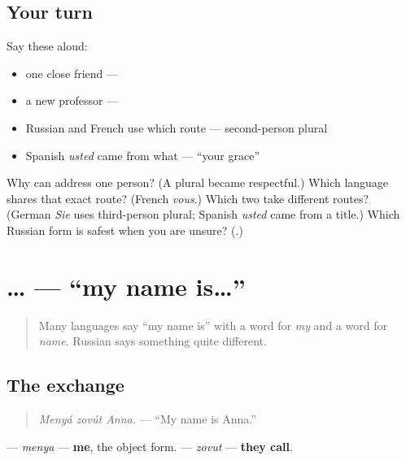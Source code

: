 \subsection*{Your turn}
Say these aloud:

\begin{itemize}
\raggedright
  \item one close friend — \emph{}
  \item a new professor — \emph{}
  \item Russian and French use which route — second-person plural
  \item Spanish \emph{usted} came from what — \textquotedblleft{}your grace\textquotedblright{}
\end{itemize}

\begin{tcolorbox}[breakable,colback=teal!4,colframe=teal!35!black,title={Before you move on}]
Why can \emph{} address one person? (A plural became respectful.) Which language shares that exact route? (French \emph{vous}.) Which two take different routes? (German \emph{Sie} uses third-person plural; Spanish \emph{usted} came from a title.) Which Russian form is safest when you are unsure? (\emph{}.)
\end{tcolorbox}
\section[\texorpdfstring{\ru{меня} \ru{зовут}… (menyá zovút)}{меня зовут… (menyá zovút)}]{ … — \textquotedblleft{}my name is…\textquotedblright{}}

\label{lesson:RU-C02-menya-zovut}



\begin{quote}
Many languages say \textquotedblleft{}my name is\textquotedblright{} with a word for \emph{my} and a word for \emph{name}. Russian says something quite different.
\end{quote}

\subsection*{The exchange}
\begin{quote}
\emph{Menyá zovút Anna.} — \textquotedblleft{}My name is Anna.\textquotedblright{}
\end{quote}

\textbf{} — \emph{menya} — \textbf{me}, the object form. \textbf{} — \emph{zovut} — \textbf{they call}.

